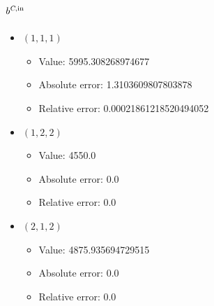 \documentclass{article}%
\begin{document}
\subsection{$b^{\textsl{C},\text{in}}$}%
\begin{itemize}%
	\item $(1, 1, 1)$%
	\begin{itemize}%
		\item Value: 5995.308268974677%
		\item Absolute error: 1.3103609807803878%
		\item Relative error: 0.00021861218520494052%
	\end{itemize}%
	\item $(1, 2, 2)$%
	\begin{itemize}%
		\item Value: 4550.0%
		\item Absolute error: 0.0%
		\item Relative error: 0.0%
	\end{itemize}%
	\item $(2, 1, 2)$%
	\begin{itemize}%
		\item Value: 4875.935694729515%
		\item Absolute error: 0.0%
		\item Relative error: 0.0%
	\end{itemize}%
\end{itemize}%
\end{document}
